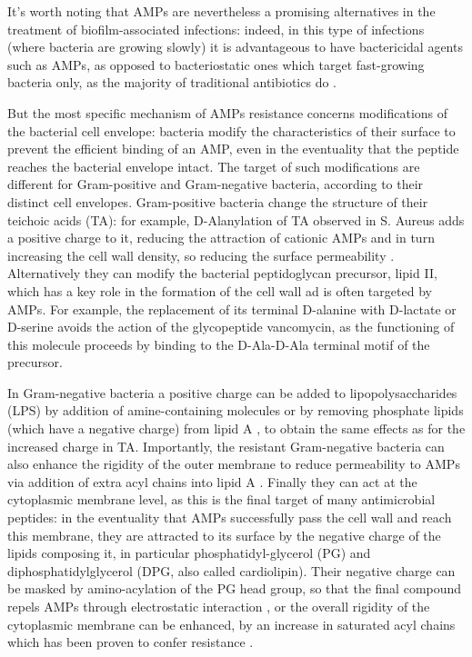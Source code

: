 It's worth noting that AMPs are nevertheless a promising alternatives in the treatment of biofilm-associated infections: indeed, in this type of infections (where bacteria are growing slowly) it is advantageous to have bactericidal agents such as AMPs, as opposed to bacteriostatic ones which target fast-growing bacteria only, as the majority of traditional antibiotics do \cite{Strempel2014}.

But the most specific mechanism of AMPs resistance concerns modifications of the bacterial cell envelope: bacteria modify the characteristics of their surface to prevent the efficient binding of an AMP, even in the eventuality that the peptide reaches the bacterial envelope intact. 
%
The target of such modifications are different for Gram-positive and Gram-negative bacteria, according to their distinct cell envelopes.
%
Gram-positive bacteria change the structure of their teichoic acids (TA): for example, D-Alanylation of TA observed in S. Aureus adds a positive charge to it, reducing the attraction of cationic AMPs and in turn increasing the cell wall density, so reducing the surface permeability \cite{Saar-Dover2012}.
%
Alternatively they can modify the bacterial peptidoglycan precursor, lipid II, which has a key role in the formation of the cell wall ad is often targeted by AMPs. For example, the replacement of its terminal D-alanine with D-lactate or D-serine \cite{Bugg1991} avoids the action of the glycopeptide vancomycin, as the functioning of this molecule proceeds by binding to the D-Ala-D-Ala terminal motif of the precursor.

In Gram-negative bacteria a positive charge can be added to lipopolysaccharides (LPS) by addition of amine-containing molecules \cite{Moskowitz2004} or by removing phosphate lipids (which have a negative charge) from lipid A \cite{Wang2006lpx}, to obtain the same effects as for the increased charge in TA.
%
Importantly, the resistant Gram-negative bacteria can also enhance the rigidity of the outer membrane to reduce permeability to AMPs via addition of extra acyl chains into lipid A \cite{Guo1998}.
%
Finally they can act at the cytoplasmic membrane level, as this is the final target of many antimicrobial peptides: in the eventuality that AMPs successfully pass the cell wall and reach this membrane, they are attracted to its surface by the negative charge of the lipids composing it, in particular phosphatidyl-glycerol (PG) and diphosphatidylglycerol (DPG, also called cardiolipin). Their negative charge can be masked by amino-acylation of the PG head group, so that the final compound repels AMPs through electrostatic interaction \cite{Peschel2001}, or the overall rigidity of the cytoplasmic membrane can be enhanced, by an increase in saturated acyl chains which has been proven to confer resistance \cite{Kumariya2015}.

